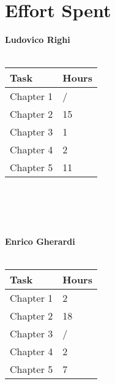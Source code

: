 \chapter{Effort Spent}
\textbf{Ludovico Righi} \\ \\
\begin{tabular}{ |p{5cm}|p{3cm}| }
 \hline
 Task&Hours\\
 \hline
 Chapter 1   & /  \\
 Chapter 2   & 15  \\ 
 Chapter 3  &  1  \\
 Chapter 4 &  2 \\ 
 Chapter 5 &  11 \\ 
 \hline
\end{tabular} \\ \\ \\ \\
\textbf{Enrico Gherardi} \\ \\
\begin{tabular}{ |p{5cm}|p{3cm}| }
 \hline
 Task&Hours\\
 \hline
 Chapter 1   &  2  \\
 Chapter 2   &  18  \\ 
 Chapter 3  &  /  \\
 Chapter 4 &  2  \\ 
 Chapter 5 & 7 \\ 
 \hline
\end{tabular} \\ \\ \\ \\